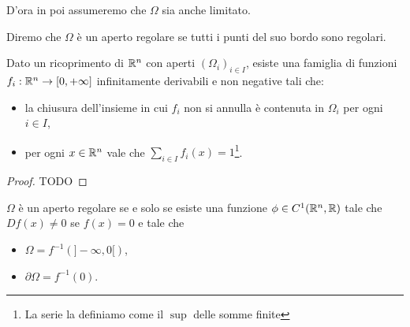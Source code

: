 D'ora in poi assumeremo che $\Omega$ sia anche limitato.

\begin{definition}
	Diremo che $\Omega$ è un aperto regolare se tutti i punti del suo bordo sono regolari.
\end{definition}


\begin{theorem}\label{thm:PartizioneUnita}
	Dato un ricoprimento di $\mathbb R^n$ con aperti $(\Omega_i)_{i\in I}$, esiste una famiglia di funzioni $f_i:\mathbb R^n\to[0,+\infty]$ infinitamente derivabili
	e non negative tali che:
	\begin{itemize}
		\item la chiusura dell'insieme in cui $f_i$ non si annulla è contenuta in $\Omega_i$ per ogni $i\in I$,
		\item per ogni $x\in\mathbb R^n$ vale che $\sum_{i\in I} f_i(x)=1$\footnote{La serie la definiamo come il $\sup$ delle somme finite}.
	\end{itemize}
\end{theorem}
\begin{proof}
	TODO
\end{proof}

\begin{lemma}\label{lem:EquivRegolare}
	$\Omega$ è un aperto regolare se e solo se esiste una funzione $\phi\in C^1(\mathbb R^n,\mathbb R)$ tale che $Df(x)\neq 0$ se $f(x)=0$ e tale che
	\begin{itemize}
		\item $\Omega = f^{-1}(]-\infty,0[)$,
		\item $\partial \Omega = f^{-1}(0)$.
	\end{itemize}
\end{lemma}

